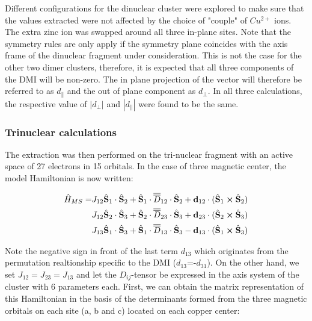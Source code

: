\documentclass[12pt]{report}
\numberwithin{equation}{section}
\begin{document}
Different configurations for the dinuclear cluster were explored to make sure that the values extracted were not affected by the choice of "couple" of $Cu^{2+}$ ions. 
The extra zinc ion was swapped around all three in-plane sites. 
Note that the symmetry rules are only apply if the symmetry plane coincides with the axis frame of the dinuclear fragment under consideration.
This is not the case for the other two dimer clusters, therefore, it is expected that all three components of the DMI will be non-zero.
The in plane projection of the vector will therefore be referred to as $d_{\parallel}$ and the out of plane component as $d_{\perp}$.
In all three calculations, the respective value of $|d_{\perp}|$ and $|d_{\parallel}|$ were found to be the same.

\subsubsection*{Trinuclear calculations}

The extraction was then performed on the tri-nuclear fragment with an active space of 27 electrons in 15 orbitals.
In the case of three magnetic center, the model Hamiltonian is now written:


\begin{equation}
    \begin{split}
    \hat{H}_{MS}=&J_{12} \hat{\vb S}_1 \cdot \hat{\vb S}_2 + \hat{\vb S}_1 \cdot\overline{\overline{D}}_{12} \cdot \hat{\vb S}_2 + \vb{d}_{12} \cdot (\hat{\vb S}_1 \cross \hat{\vb S}_2)\\
    &J_{12} \hat{\vb S}_2 \cdot \hat{\vb S}_3 + \hat{\vb S}_2 \cdot\overline{\overline{D}}_{23} \cdot \hat{\vb S}_3 + \vb{d}_{23} \cdot (\hat{\vb S}_2 \cross \hat{\vb S}_3)\\
    &J_{13} \hat{\vb S}_1 \cdot \hat{\vb S}_3 + \hat{\vb S}_1 \cdot\overline{\overline{D}}_{13} \cdot \hat{\vb S}_3 - \vb{d}_{13} \cdot (\hat{\vb S}_1 \cross \hat{\vb S}_3)
    \end{split}
\end{equation}

Note the negative sign in front of the last term $d_{13}$ which originates from the permutation realtionship specific to the DMI ($d_{13}$=-$d_{31}$).
On the other hand, we set $J_{12}=J_{23}=J_{13}$ and let the $D_{ij}$-tensor be expressed in the axis system of the cluster with 6 parameters each.
First, we can obtain the matrix representation of this Hamiltonian in the basis of the determinants formed from the three magnetic orbitals on each site (a, b and c) located on each copper center:
\end{document}

